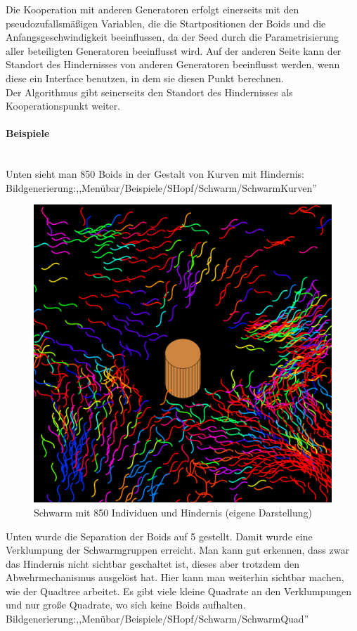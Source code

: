 \documentclass[../mciAusarbeitung.tex]{subfiles}
\begin{document}
		Die Kooperation mit anderen Generatoren erfolgt einerseits mit den pseudozufallsmäßigen Variablen, die die Startpositionen der Boids und die Anfangsgeschwindigkeit beeinflussen, da der Seed durch die Parametrisierung aller beteiligten Generatoren beeinflusst wird. Auf der anderen Seite kann der Standort des Hindernisses von anderen Generatoren beeinflusst werden, wenn diese ein Interface benutzen, in dem sie diesen Punkt berechnen.\\
		Der Algorithmus gibt seinerseits den Standort des Hindernisses als Kooperationspunkt weiter.\\
		
		\paragraph{Beispiele}$~$\\
		Unten sieht man 850 Boids in der Gestalt von Kurven mit Hindernis:\\
		Bildgenerierung:,,Menübar/Beispiele/SHopf/Schwarm/SchwarmKurven''\\
		\begin{figure}[H]
			\centering
			\includegraphics[width=0.5\linewidth]{img/schwarmKurven.png}
			\caption[SchwarmKurven]{Schwarm mit 850 Individuen und Hindernis (eigene Darstellung)}
		\end{figure}
		\noindent Unten wurde die Separation der Boids auf 5 gestellt. Damit wurde eine Verklumpung der Schwarmgruppen erreicht. Man kann gut erkennen, dass zwar das Hindernis nicht sichtbar geschaltet ist, dieses aber trotzdem den Abwehrmechanismus ausgelöst hat. Hier kann man weiterhin sichtbar machen, wie der Quadtree arbeitet. Es gibt viele kleine Quadrate an den Verklumpungen und nur große Quadrate, wo sich keine Boids aufhalten.\\
		Bildgenerierung:,,Menübar/Beispiele/SHopf/Schwarm/SchwarmQuad''\\
\end{document}
